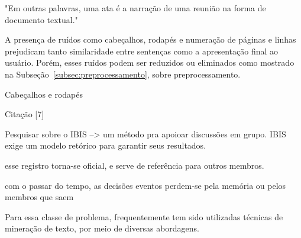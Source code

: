 "Em outras palavras, uma ata é a narração de uma reunião na forma de documento textual."

A presença de ruídos como cabeçalhos, rodapés e numeração de páginas e linhas prejudicam tanto similaridade entre sentenças como a apresentação final ao usuário. Porém, esses ruídos podem ser reduzidos ou eliminados como mostrado na Subseção~\ref{subsec:preprocessamento}, sobre preprocessamento.


  Cabeçalhos e rodapés







Citação [7]

Pesquisar sobre o IBIS --> um método pra apoioar discussões em grupo.
IBIS exige um modelo retórico para garantir seus resultados.

 esse registro torna-se oficial, e serve de referência para outros membros. 

 com o passar do tempo, as decisões eventos perdem-se pela memória ou pelos membros que saem



Para essa classe de problema, frequentemente tem sido utilizadas técnicas de mineração de texto, por meio de diversas abordagens.  


